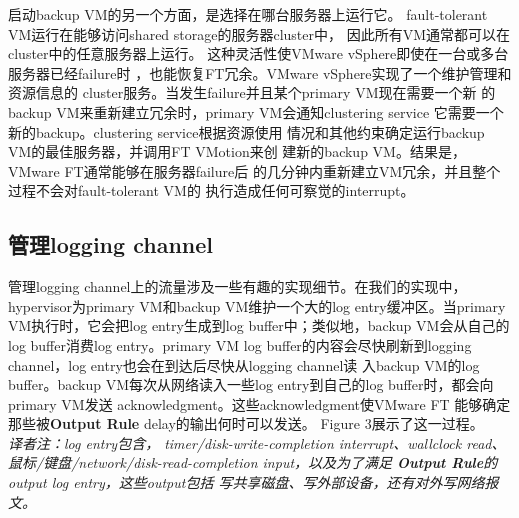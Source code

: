 启动backup VM的另一个方面，是选择在哪台服务器上运行它。%
fault-tolerant VM运行在能够访问shared storage的服务器cluster中，%
因此所有VM通常都可以在cluster中的任意服务器上运行。%
这种灵活性使VMware vSphere即使在一台或多台服务器已经failure时%
，也能恢复FT冗余。VMware vSphere实现了一个维护管理和资源信息的%
cluster服务。当发生failure并且某个primary VM现在需要一个新%
的backup VM来重新建立冗余时，primary VM会通知clustering service%
它需要一个新的backup。clustering service根据资源使用%
情况和其他约束确定运行backup VM的最佳服务器，并调用FT VMotion来创%
建新的backup VM。结果是，VMware FT通常能够在服务器failure后%
的几分钟内重新建立VM冗余，并且整个过程不会对fault-tolerant VM的%
执行造成任何可察觉的interrupt。

\subsection{管理logging channel}

\insertfigurethree

管理logging channel上的流量涉及一些有趣的实现细节。在我们的实现中，%
hypervisor为primary VM和backup VM维护一个大的log %
entry缓冲区。当primary VM执行时，它会把log entry生成到log %
buffer中；类似地，backup VM会从自己的log buffer消费log %
entry。primary VM log buffer的内容会尽快刷新到logging %
channel，log entry也会在到达后尽快从logging channel读%
入backup VM的log buffer。backup VM每次从网络读入一些log %
entry到自己的log buffer时，都会向primary VM发送%
acknowledgment。这些acknowledgment使VMware FT%
能够确定那些被\textbf{Output Rule} delay的输出何时可以发送。%
Figure 3展示了这一过程。\\\emph{译者注：log entry包含，%
timer/disk-write-completion interrupt、wallclock read、%
鼠标/键盘/network/disk-read-completion input，以及为了满足%
\textbf{Output Rule}的output log entry，这些output包括%
写共享磁盘、写外部设备，还有对外写网络报文。}%

